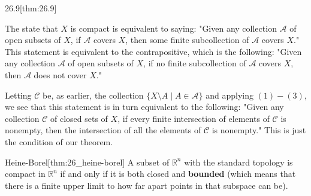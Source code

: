 \begin{thmBox}{26.9}[thm:26.9]
\begin{proofBox}
        \baseSkip

        The state that \( X \) is compact is equivalent to saying: "Given any
        collection \( \mathcal{A} \) of open subsets of \( X \), if
        \( \mathcal{A} \) covers \( X \), then some finite subcollection of 
        \( \mathcal{A} \) covers \( X \)."
        This statement is equivalent to the contrapositive, which is the 
        following: "Given any collection \( \mathcal{A} \) of open subsets of 
        \( X \), if no finite subcollection of \( \mathcal{A} \) covers \( X \),
        then \( \mathcal{A} \) does not cover \( X \)."

        \baseSkip

        Letting \( \mathcal{C} \) be, as earlier, the collection 
        \( \{ X \setminus A \mid A \in \mathcal{A} \} \) and applying 
        \( ( 1 ) - ( 3 ) \), we see that this statement is in turn equivalent
        to the following: "Given any collection \( \mathcal{C} \) of closed
        sets of \( X \), if every finite intersection of elements of 
        \( \mathcal{C} \) is nonempty, then the intersection of all the
        elements of \( \mathcal{C} \) is nonempty." This is just the condition
        of our theorem.
    \end{proofBox}
\end{thmBox}

\begin{thmBox}{Heine-Borel}[thm:26_heine-borel]
    A subset of \( \mathbb{R}^{ n } \) with the standard topology is compact in
    \( \mathbb{R}^{ n } \) if and only if it is both closed and \textbf{bounded}
    (which means that there is a finite upper limit to how far apart points in that subspace can be).

    \baseRule

    \begin{proofBox}

    \end{proofBox}
\end{thmBox} 